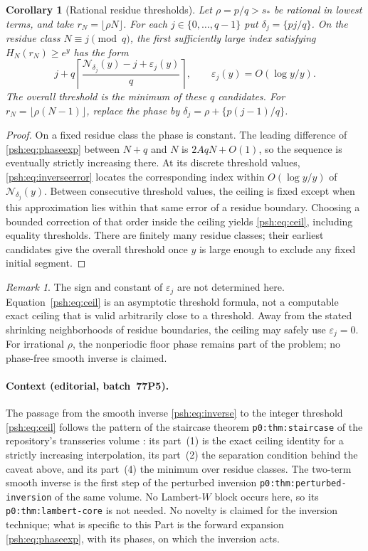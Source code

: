 \documentclass[11pt,a4paper]{article}
\numberwithin{equation}{section}
\newtheorem{corollary}[theorem]{Corollary}
\theoremstyle{remark}\newtheorem{remark}[theorem]{Remark}
\begin{document}
\begin{corollary}[Rational residue thresholds]\label{psh:cor:threshold}
Let $\rho=p/q>s_*$ be rational in lowest terms, and take
$r_N=\lfloor\rho N\rfloor$. For each $j\in\{0,\ldots,q-1\}$ put
$\delta_j=\{pj/q\}$. On the residue class $N\equiv j\pmod q$, the
first sufficiently large index satisfying $H_N(r_N)\geq e^y$ has the form
\begin{equation}\label{psh:eq:ceil}
 j+q\left\lceil\frac{\mathcal N_{\delta_j}(y)-j+\varepsilon_j(y)}q
       \right\rceil,
 \qquad \varepsilon_j(y)=O(\log y/y).
\end{equation}
The overall threshold is the minimum of these $q$ candidates. For
$r_N=\lfloor\rho(N-1)\rfloor$, replace the phase by
$\delta_j=\rho+\{p(j-1)/q\}$.
\end{corollary}
\begin{proof}
On a fixed residue class the phase is constant.
The leading difference of \eqref{psh:eq:phaseexp} between $N+q$ and $N$ is
$2AqN+O(1)$, so the sequence is eventually strictly increasing there.
At its discrete threshold values, \eqref{psh:eq:inverseerror} locates the
corresponding index within $O(\log y/y)$ of
$\mathcal N_{\delta_j}(y)$. Between consecutive threshold values, the
ceiling is fixed except when this approximation lies within that same
error of a residue boundary. Choosing a bounded correction of that order
inside the ceiling yields \eqref{psh:eq:ceil}, including equality thresholds.
There are finitely many residue classes; their earliest candidates give
the overall threshold once $y$ is large enough to exclude any fixed
initial segment.
\end{proof}
\begin{remark}
The sign and constant of $\varepsilon_j$ are not determined here.
Equation~\eqref{psh:eq:ceil} is an asymptotic threshold formula, not a
computable exact ceiling that is valid arbitrarily close to a threshold.
Away from the stated shrinking neighborhoods of residue boundaries, the
ceiling may safely use $\varepsilon_j=0$. For irrational $\rho$, the
nonperiodic floor phase remains part of the problem; no phase-free
smooth inverse is claimed.
\end{remark}

\paragraph{Context (editorial, batch~77P5).} The passage from the smooth
inverse \eqref{psh:eq:inverse} to the integer threshold \eqref{psh:eq:ceil}
follows the pattern of the staircase theorem \texttt{p0:thm:staircase} of the
repository's transseries volume \cite{psh-tai}: its part~(1) is the exact
ceiling identity for a strictly increasing interpolation, its part~(2) the
separation condition behind the caveat above, and its part~(4) the minimum
over residue classes. The two-term smooth inverse is the first step of the
perturbed inversion \texttt{p0:thm:perturbed-inversion} of the same volume.
No Lambert-$W$ block occurs here, so its \texttt{p0:thm:lambert-core} is not
needed. No novelty is claimed for the inversion technique; what is specific
to this Part is the forward expansion \eqref{psh:eq:phaseexp}, with its
phases, on which the inversion acts.
\end{document}
